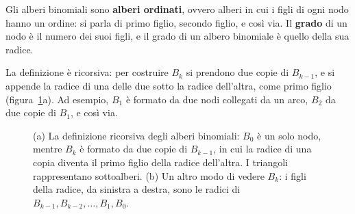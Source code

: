 Gli alberi binomiali sono \textbf{alberi ordinati}, ovvero alberi in cui i figli di ogni nodo hanno un ordine: si parla di primo figlio, secondo figlio, e così via. Il \textbf{grado} di un nodo è il numero dei suoi figli, e il grado di un albero binomiale è quello della sua radice.

La definizione è ricorsiva: per costruire $B_k$ si prendono due copie di $B_{k-1}$, e si appende la radice di una delle due sotto la radice dell'altra, come primo figlio (figura~\ref{fig:hb-definizione}a). Ad esempio, $B_1$ è formato da due nodi collegati da un arco, $B_2$ da due copie di $B_1$, e così via.

\begin{figure}[htbp]
\centering
{}
\caption{(a) La definizione ricorsiva degli alberi binomiali: $B_0$ è un solo nodo, mentre $B_k$ è formato da due copie di $B_{k-1}$, in cui la radice di una copia diventa il primo figlio della radice dell'altra. I triangoli rappresentano sottoalberi. (b) Un altro modo di vedere $B_k$: i figli della radice, da sinistra a destra, sono le radici di $B_{k-1}, B_{k-2}, \ldots, B_1, B_0$.}
\label{fig:hb-definizione}
\end{figure}

